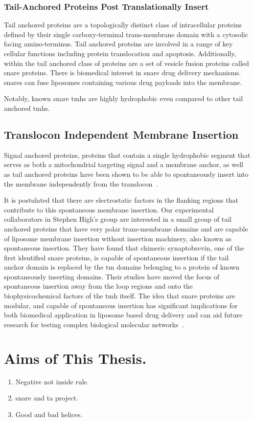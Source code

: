 \subsubsection{Tail-Anchored Proteins Post Translationally Insert}

Tail anchored proteins are a topologically distinct class of intracellular proteins defined by their single carboxy-terminal trans-membrane domain with a cytosolic facing amino-terminus. Tail anchored proteins are involved in a range of key cellular functions including protein translocation and apoptosis. Additionally, within the tail anchored class of proteins are a set of vesicle fusion proteins called \gls{snare} proteins. There is biomedical interest in \gls{snare} drug delivery mechanisms. \gls{snare}s can fuse liposomes containing various drug payloads into the membrane.

Notably, known \gls{snare} \gls{tmh}s are highly hydrophobic even compared to other tail anchored \gls{tmh}s.

\subsection{Translocon Independent Membrane Insertion}
Signal anchored proteins, proteins that contain a single hydrophobic segment that serves as both a mitochondrial targeting signal and a membrane anchor, as well as tail anchored proteins have been shown to be able to spontaneously insert into the membrane independently from the translocon~\cite{Elisa2012, Lan2000, Colombo2009}.

It is postulated that there are electrostatic factors in the flanking regions that contribute to this spontaneous membrane insertion. Our experimental collaborators in Stephen High’s group are interested in a small group of tail anchored proteins that have very polar trans-membrane domains and are capable of liposome membrane insertion without insertion machinery, also known as spontaneous insertion. They have found that chimeric synaptobrevin, one of the first identified \gls{snare} proteins, is capable of spontaneous insertion if the tail anchor domain is replaced by the \gls{tm} domains belonging to a protein of known spontaneously inserting domains. Their studies have moved the focus of spontaneous insertion away from the loop regions and onto the biophysicochemical factors of the \gls{tmh} itself. The idea that \gls{snare} proteins are modular, and capable of spontaneous insertion has significant implications for both biomedical application in liposome based drug delivery and can aid future research for testing complex biological molecular networks~\cite{Allen2013, Nordlund2014}.


\section{Aims of This Thesis.}

\begin{enumerate}
  \item Negative not inside rule.
  \item \gls{snare} and \gls{ta} project.
  \item Good and bad helices.
\end{enumerate}

